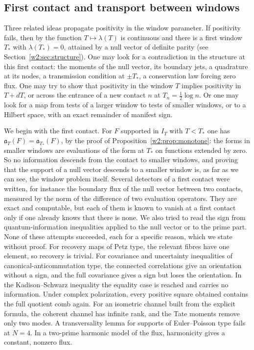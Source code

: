 \documentclass[11pt]{amsart}
\theoremstyle{definition}
\theoremstyle{remark}
\numberwithin{equation}{section}
\newcommand{\IT}{I_T}                                  %
\newcommand{\aT}{\mathfrak{a}_T}                       %
\newcommand{\lam}{\lambda(T)}                          %
\newcommand{\Tst}{T_{*}}                               %
\begin{document}
\subsection{First contact and transport between windows}\label{w8:fam:R25}

Three related ideas propagate positivity in the window parameter. If positivity fails, then by
\cite[Lemmas~3.10 and~10.17]{P46} the function $T\mapsto\lam$ is continuous and there is a first window $\Tst$
with $\lambda(\Tst)=0$, attained by a null vector of definite parity (see Section~\ref{w2:sec:structure}). One
may look for a contradiction in the structure at this first contact: the moments of the null vector, its
boundary jets, a quadrature at its nodes, a transmission condition at $\pm\Tst$, a conservation law forcing zero
flux. One may try to show that positivity in the window $T$ implies positivity in $T+dT$, or across the entrance
of a new contact $n$ at $T_n=\frac12\log n$. Or one may look for a map from tests of a larger window to tests of
smaller windows, or to a Hilbert space, with an exact remainder of manifest sign.

\label{w8:tab:contact}
We begin with the first contact. For $F$ supported in $\IT$ with $T<\Tst$ one has $\aT(F)=\mathfrak
a_{\Tst}(F)$, by the proof of Proposition~\ref{w2:prop:monotone}: the forms in smaller windows are evaluations
of the form at $\Tst$ on functions extended by zero. So no information descends from the contact to smaller
windows, and proving that the support of a null vector descends to a smaller window is, as far as we can see,
the window problem itself. Several detectors of a first contact were written, for instance the boundary flux of
the null vector between two contacts, measured by the norm of the difference of two evaluation operators. They
are exact and computable, but each of them is known to vanish at a first contact only if one already knows that
there is none. We also tried to read the sign from quantum-information inequalities applied to the null vector
or to the prime part. None of these attempts succeeded, each for a specific reason, which we state without
proof. For recovery maps of Petz type, the relevant fibres have one element, so recovery is trivial. For
covariance and uncertainty inequalities of canonical-anticommutation type, the connected correlations give an
orientation without a sign, and the full covariance gives a sign but loses the orientation. In the
Kadison--Schwarz inequality the equality case is reached and carries no information. Under complex polarization,
every positive square obtained contains the full quotient comb again. For an isometric channel built from the
explicit formula, the coherent channel has infinite rank, and the Tate moments remove only two modes. A
transversality lemma for supports of Euler--Poisson type fails at $N=4$. In a two-prime harmonic model of the
flux, harmonicity gives a constant, nonzero flux.
\end{document}
